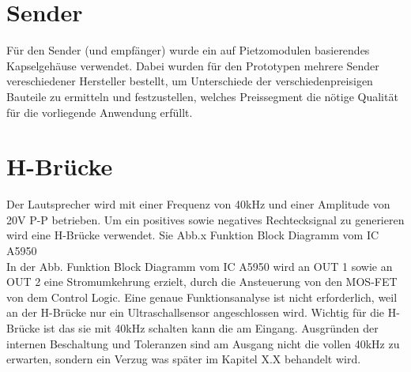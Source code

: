 \section{Sender}
Für den Sender (und empfänger) wurde ein auf Pietzomodulen basierendes Kapselgehäuse verwendet. Dabei wurden für den Prototypen mehrere Sender vereschiedener Hersteller bestellt, um Unterschiede der verschiedenpreisigen Bauteile zu ermitteln und festzustellen, welches Preissegment die nötige Qualität für die vorliegende Anwendung erfüllt.

\section{H-Brücke}
Der Lautsprecher wird mit einer Frequenz von 40kHz und einer Amplitude von 20V P-P betrieben. Um ein positives sowie negatives Rechtecksignal zu generieren wird eine H-Brücke verwendet. Sie Abb.x Funktion Block Diagramm vom IC A5950\\
In der Abb. Funktion Block Diagramm vom IC A5950 wird an OUT 1 sowie an OUT 2 eine Stromumkehrung erzielt, durch die Ansteuerung von den MOS-FET von dem Control Logic. Eine genaue Funktionsanalyse ist nicht erforderlich, weil an der H-Brücke nur ein Ultraschallsensor
angeschlossen wird. Wichtig für die H-Brücke ist das sie mit 40kHz schalten kann die am Eingang. Ausgründen der internen Beschaltung und Toleranzen sind am Ausgang nicht die vollen 40kHz zu erwarten, sondern ein Verzug was später im Kapitel X.X behandelt wird.

